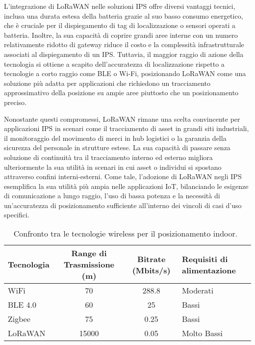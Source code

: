 L'integrazione di LoRaWAN nelle soluzioni IPS offre diversi vantaggi tecnici, inclusa una durata estesa della batteria grazie al suo basso consumo energetico, che è cruciale per il dispiegamento di tag di localizzazione o sensori operati a batteria. Inoltre, la sua capacità di coprire grandi aree interne con un numero relativamente ridotto di gateway riduce il costo e la complessità infrastrutturale associati al dispiegamento di un IPS. Tuttavia, il maggior raggio di azione della tecnologia si ottiene a scapito dell'accuratezza di localizzazione rispetto a tecnologie a corto raggio come BLE o Wi-Fi, posizionando LoRaWAN come una soluzione più adatta per applicazioni che richiedono un tracciamento approssimativo della posizione su ampie aree piuttosto che un posizionamento preciso.

Nonostante questi compromessi, LoRaWAN rimane una scelta convincente per applicazioni IPS in scenari come il tracciamento di asset in grandi siti industriali, il monitoraggio del movimento di merci in hub logistici o la garanzia della sicurezza del personale in strutture estese. La sua capacità di passare senza soluzione di continuità tra il tracciamento interno ed esterno migliora ulteriormente la sua utilità in scenari in cui asset o individui si spostano attraverso confini interni-esterni. Come tale, l'adozione di LoRaWAN negli IPS esemplifica la sua utilità più ampia nelle applicazioni IoT, bilanciando le esigenze di comunicazione a lungo raggio, l'uso di bassa potenza e la necessità di un'accuratezza di posizionamento sufficiente all'interno dei vincoli di casi d'uso specifici.

\begin{table}[ht]
    \centering
    \caption{Confronto tra le tecnologie wireless per il posizionamento indoor.~\cite{Sadowski2018}}
    \label{tab:wireless_comparison}
    \begin{tabularx}{\textwidth}{@{}lccX@{}}
        \toprule
        Tecnologia & {Range di Trasmissione (m)} & {Bitrate (Mbits/s)} & {Requisiti di alimentazione} \\
        \midrule
        WiFi       & 70                          & 288.8               & Moderati                 \\
        BLE 4.0    & 60                          & 25                  & Bassi                    \\
        Zigbee     & 75                          & 0.25                & Bassi                    \\
        LoRaWAN    & 15000                       & 0.05                & Molto Bassi              \\
        \bottomrule
    \end{tabularx}
\end{table}

